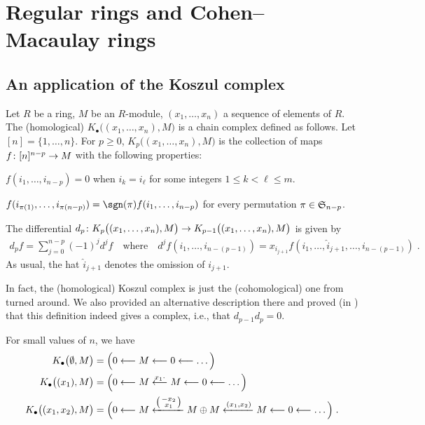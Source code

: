 \documentclass[a4paper,parskip=half,numbers=enddot, DIV=12]{scrreprt}
\begin{document}
\chapter{Regular rings and Cohen--Macaulay rings}
\section{An application of the Koszul complex}
\begin{defi}
	Let $R$ be a ring, $M$ be an $R$-module, $(x_1,\ldots,x_n)$ a sequence of elements of $R$. The (homological)  $K_\bullet\big((x_1,\ldots,x_n),M\big)$ is a chain complex defined as follows. Let $[n]=\{1,\ldots,n\}$. For $p\geq0$, $K_p\big((x_1,\ldots,x_n),M\big)$ is the collection of maps $f\colon [n]^{n-p}\morphism M$ with the following properties:
	\begin{alphanumerate}
		\item $f(i_1,\ldots,i_{n-p})=0$ when $i_k=i_\ell$ for some integers $1\leq k<\ell\leq m$.
		\item $f(i_{\pi(1)},\ldots,i_{\pi(n-p)})=\sgn(\pi)f(i_1,\ldots,i_{n-p})$ for every permutation $\pi\in\mathfrak{S}_{n-p}$.
	\end{alphanumerate}
	The differential $d_p\colon K_p\big((x_1,\ldots,x_n),M\big)\morphism K_{p-1}\big((x_1,\ldots,x_n),M\big)$ is given by 
	\begin{align*}
	d_pf=\sum_{j=0}^{n-p}(-1)^jd^jf\quad\text{where}\quad d^ jf(i_1,\ldots,i_{n-(p-1)})=x_{i_{j+1}}f(i_1,\ldots,\hat{i}_{j+1},\ldots,i_{n-(p-1)})\;.
	\end{align*}
	As usual, the hat $\hat{i}_{j+1}$ denotes the omission of $i_{j+1}$.
\end{defi}
In fact, the (homological) Koszul complex is just the (cohomological) one from \cite[Definition~2.1.3]{alggeo2} turned around. We also provided an alternative description there and proved (in \cite[Remark~2.1.1]{alggeo2}) that this definition indeed gives a complex, i.e., that $d_{p-1}d_p=0$.

\begin{example}
	For small values of $n$, we have
	\begin{align*}
	K_\bullet\big(\emptyset,M\big)&=\Big(0\lmorphism M\lmorphism 0\lmorphism\ldots\Big)\\
	K_\bullet\big((x_1),M\big)&=\Big(0\lmorphism M\lmorphism[x_1\cdot] M\lmorphism 0\lmorphism\ldots\Big)\\
	K_\bullet\big((x_1,x_2),M\big)&=\Big(0\lmorphism M\xleftarrow{\left(\begin{smallmatrix}
		-x_2\\
		x_1
		\end{smallmatrix}\right)} M\oplus M\xleftarrow{(x_1,x_2)} M\lmorphism 0\lmorphism\ldots\Big)\;.
	\end{align*}
\end{example}
\end{document}
